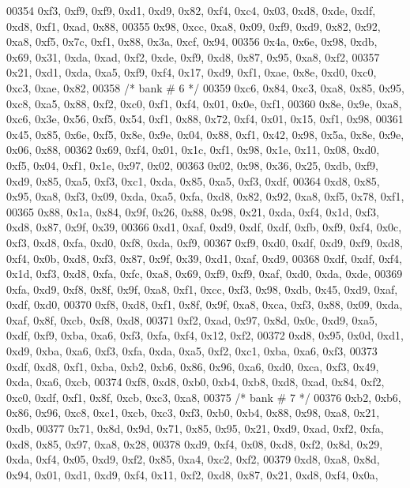 \begin{DoxyCode}
00354     0xf3, 0xf9, 0xf9, 0xd1, 0xd9, 0x82, 0xf4, 0xc4, 0x03, 0xd8, 0xde, 0xdf, 0xd8, 0xf1, 0xad, 0x88,
00355     0x98, 0xcc, 0xa8, 0x09, 0xf9, 0xd9, 0x82, 0x92, 0xa8, 0xf5, 0x7c, 0xf1, 0x88, 0x3a, 0xcf, 0x94,
00356     0x4a, 0x6e, 0x98, 0xdb, 0x69, 0x31, 0xda, 0xad, 0xf2, 0xde, 0xf9, 0xd8, 0x87, 0x95, 0xa8, 0xf2,
00357     0x21, 0xd1, 0xda, 0xa5, 0xf9, 0xf4, 0x17, 0xd9, 0xf1, 0xae, 0x8e, 0xd0, 0xc0, 0xc3, 0xae, 0x82,
00358     \textcolor{comment}{/* bank # 6 */}
00359     0xc6, 0x84, 0xc3, 0xa8, 0x85, 0x95, 0xc8, 0xa5, 0x88, 0xf2, 0xc0, 0xf1, 0xf4, 0x01, 0x0e, 0xf1,
00360     0x8e, 0x9e, 0xa8, 0xc6, 0x3e, 0x56, 0xf5, 0x54, 0xf1, 0x88, 0x72, 0xf4, 0x01, 0x15, 0xf1, 0x98,
00361     0x45, 0x85, 0x6e, 0xf5, 0x8e, 0x9e, 0x04, 0x88, 0xf1, 0x42, 0x98, 0x5a, 0x8e, 0x9e, 0x06, 0x88,
00362     0x69, 0xf4, 0x01, 0x1c, 0xf1, 0x98, 0x1e, 0x11, 0x08, 0xd0, 0xf5, 0x04, 0xf1, 0x1e, 0x97, 0x02,
00363     0x02, 0x98, 0x36, 0x25, 0xdb, 0xf9, 0xd9, 0x85, 0xa5, 0xf3, 0xc1, 0xda, 0x85, 0xa5, 0xf3, 0xdf,
00364     0xd8, 0x85, 0x95, 0xa8, 0xf3, 0x09, 0xda, 0xa5, 0xfa, 0xd8, 0x82, 0x92, 0xa8, 0xf5, 0x78, 0xf1,
00365     0x88, 0x1a, 0x84, 0x9f, 0x26, 0x88, 0x98, 0x21, 0xda, 0xf4, 0x1d, 0xf3, 0xd8, 0x87, 0x9f, 0x39,
00366     0xd1, 0xaf, 0xd9, 0xdf, 0xdf, 0xfb, 0xf9, 0xf4, 0x0c, 0xf3, 0xd8, 0xfa, 0xd0, 0xf8, 0xda, 0xf9,
00367     0xf9, 0xd0, 0xdf, 0xd9, 0xf9, 0xd8, 0xf4, 0x0b, 0xd8, 0xf3, 0x87, 0x9f, 0x39, 0xd1, 0xaf, 0xd9,
00368     0xdf, 0xdf, 0xf4, 0x1d, 0xf3, 0xd8, 0xfa, 0xfc, 0xa8, 0x69, 0xf9, 0xf9, 0xaf, 0xd0, 0xda, 0xde,
00369     0xfa, 0xd9, 0xf8, 0x8f, 0x9f, 0xa8, 0xf1, 0xcc, 0xf3, 0x98, 0xdb, 0x45, 0xd9, 0xaf, 0xdf, 0xd0,
00370     0xf8, 0xd8, 0xf1, 0x8f, 0x9f, 0xa8, 0xca, 0xf3, 0x88, 0x09, 0xda, 0xaf, 0x8f, 0xcb, 0xf8, 0xd8,
00371     0xf2, 0xad, 0x97, 0x8d, 0x0c, 0xd9, 0xa5, 0xdf, 0xf9, 0xba, 0xa6, 0xf3, 0xfa, 0xf4, 0x12, 0xf2,
00372     0xd8, 0x95, 0x0d, 0xd1, 0xd9, 0xba, 0xa6, 0xf3, 0xfa, 0xda, 0xa5, 0xf2, 0xc1, 0xba, 0xa6, 0xf3,
00373     0xdf, 0xd8, 0xf1, 0xba, 0xb2, 0xb6, 0x86, 0x96, 0xa6, 0xd0, 0xca, 0xf3, 0x49, 0xda, 0xa6, 0xcb,
00374     0xf8, 0xd8, 0xb0, 0xb4, 0xb8, 0xd8, 0xad, 0x84, 0xf2, 0xc0, 0xdf, 0xf1, 0x8f, 0xcb, 0xc3, 0xa8,
00375     \textcolor{comment}{/* bank # 7 */}
00376     0xb2, 0xb6, 0x86, 0x96, 0xc8, 0xc1, 0xcb, 0xc3, 0xf3, 0xb0, 0xb4, 0x88, 0x98, 0xa8, 0x21, 0xdb,
00377     0x71, 0x8d, 0x9d, 0x71, 0x85, 0x95, 0x21, 0xd9, 0xad, 0xf2, 0xfa, 0xd8, 0x85, 0x97, 0xa8, 0x28,
00378     0xd9, 0xf4, 0x08, 0xd8, 0xf2, 0x8d, 0x29, 0xda, 0xf4, 0x05, 0xd9, 0xf2, 0x85, 0xa4, 0xc2, 0xf2,
00379     0xd8, 0xa8, 0x8d, 0x94, 0x01, 0xd1, 0xd9, 0xf4, 0x11, 0xf2, 0xd8, 0x87, 0x21, 0xd8, 0xf4, 0x0a,

\end{DoxyCode}
